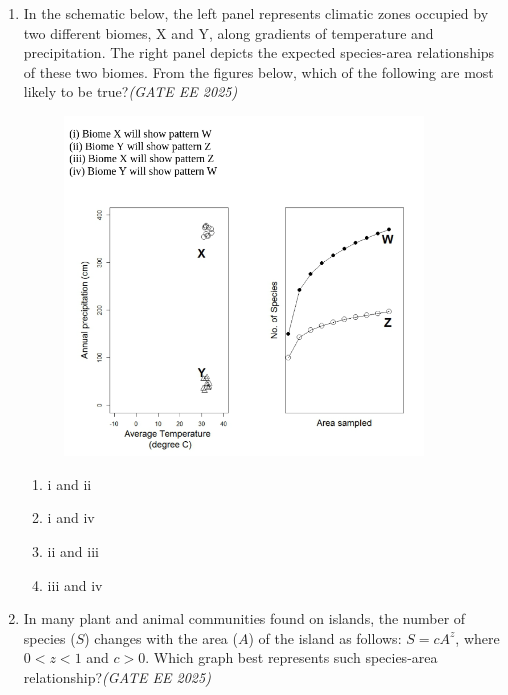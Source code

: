 \documentclass[11pt,a4paper]{article}
\begin{document}
\begin{enumerate}[leftmargin=*,label=\textbf{Q.\arabic*},resume]
\item In the schematic below, the left panel represents climatic zones occupied by two different biomes, X and Y, along gradients of temperature and precipitation. The right panel depicts the expected species-area relationships of these two biomes. From the figures below, which of the following are most likely to be true?\hfill \textit{(GATE EE 2025)}
\vspace{1em}
\begin{figure}[h!]
    \centering
    \includegraphics[width=0.9\textwidth]{imageQ35.png}
\end{figure}
\vspace{1em}
\begin{multicols}{2}
\begin{enumerate}[label=(\Alph*)]
\item i and ii
\item i and iv
\item ii and iii
\item iii and iv
\end{enumerate}
\end{multicols}

\item In many plant and animal communities found on islands, the number of species ($S$) changes with the area ($A$) of the island as follows: $S = c A^z$, where $0 < z < 1$ and $c>0$. Which graph best represents such species-area relationship?\hfill \textit{(GATE EE 2025)}


\end{enumerate}
\end{document}
